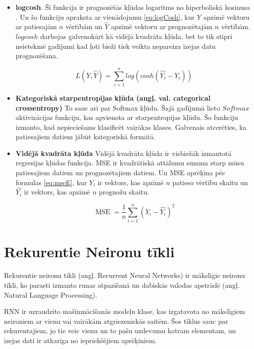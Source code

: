 \documentclass[12pt,paper=A4]{report}
\begin{document}
\begin{itemize}
\item \textbf{logcosh}. Šī funkcija ir prognozētās kļūdas logaritms no hiperboliskā kosinusa \cite{redDEs}. Un šo funkciju apraksta ar vienādojumu \ref{eq:logCosh}, kur $Y$ apzīmē vektoru ar patiesajām $n$ vērtībām un $\hat{Y}$ apzīmē vektoru ar prognozētajām $n$ vērtībām. $logcosh$ darbojas galvenokārt kā vidējā kvadrāta kļūda, bet to tik stipri neietekmē gadījumi kad ļoti bieži tiek veikta nepareiza izejas datu prognozēšana.

\begin{equation}
L(Y,\hat{Y}) = \sum_{i=1}^{n} log(cosh(\hat{Y_{i}} - Y_i))
\label{eq:logCosh}
\end{equation}

\item \textbf{Kategoriskā starpentropijas kļūda (angļ. val. categorical crossentropy)} To sauc arī par Softmax kļūdu. Šajā gadījumā lieto $Softmax$ aktivizācijas funkciju, kas apvienota ar starpentropijas kļūdu. Šo funkciju izmanto, kad nepieciešams klasificēt vairākas klases. 
Galvenais atcerēties, ka patiesajiem datiem jābūt kategoriskā formātā.

\item \textbf{Vidējā kvadrāta kļūda}
Vidējā kvadrāta kļūda ir visbiežāk izmantotā regresijas kļūdas funkcija. MSE ir kvadrātiskā attālumu summa starp mūsu patiesajiem datiem un prognozētajiem datiem. Un MSE aprēķina pēc formulas \ref{eq:mseE}, kur $Y_i$ ir vektors, kas apzīmē $n$ patieso vērtību skaitu un $\hat{Y_i}$ ir vektors, kas apzīmē $n$ prognožu skaitu. 

\begin{equation}
{\displaystyle \operatorname {MSE} ={\frac {1}{n}}\sum _{i=1}^{n}(Y_{i}-{\hat {Y_{i}}})^{2}}
\label{eq:mseE}
\end{equation}

\end{itemize}
    

    \section{Rekurentie Neironu tīkli}
Rekurentie neironu tīkli (angļ. Recurrent Neural Networks) ir mākslīgie neironu tīkli, ko parasti izmanto runas atpazīšanā un dabiskās valodas apstrādē (angļ. Natural Language Processing). 
    
   RNN ir uzraudzīto mašīnmācīšanās modeļu klase, kas izgatavota no mākslīgiem neironiem ar vienu vai vairākām atgriezeniskās saitēm. Šos tīklus sauc par rekurentajiem, jo tie veic vienu un to pašu uzdevumu katram elementam, un izejas dati ir atkarīga no iepriekšējiem aprēķiniem. 
    
\end{document}
